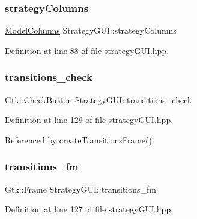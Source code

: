 \mbox{\label{class_strategy_g_u_i_a5dfaa225c4c52a2dfba9a3a5a677a924}} 
\subsubsection{\texorpdfstring{strategy\+Columns}{strategyColumns}}
{\footnotesize\ttfamily \hyperlink{class_strategy_g_u_i_1_1_model_columns}{Model\+Columns} Strategy\+G\+U\+I\+::strategy\+Columns}



Definition at line 88 of file strategy\+G\+U\+I.\+hpp.

\mbox{\label{class_strategy_g_u_i_ad74384d402b07845c2f9632f1382420b}} 
\subsubsection{\texorpdfstring{transitions\+\_\+check}{transitions\_check}}
{\footnotesize\ttfamily Gtk\+::\+Check\+Button Strategy\+G\+U\+I\+::transitions\+\_\+check}



Definition at line 129 of file strategy\+G\+U\+I.\+hpp.



Referenced by create\+Transitions\+Frame().

\mbox{\label{class_strategy_g_u_i_ab3d47a7a0fb8e1f7e030c4daad0ca8ec}} 
\subsubsection{\texorpdfstring{transitions\+\_\+fm}{transitions\_fm}}
{\footnotesize\ttfamily Gtk\+::\+Frame Strategy\+G\+U\+I\+::transitions\+\_\+fm}



Definition at line 127 of file strategy\+G\+U\+I.\+hpp.



